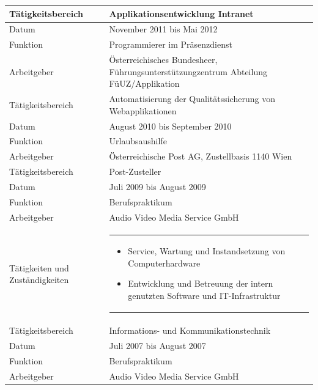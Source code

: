 \begin{longtable}{p{}|p{}}
	Tätigkeitsbereich & Applikationsentwicklung Intranet \\
	\bottomrule
	\newpage
	Datum & November 2011 bis Mai 2012 \\
	Funktion & Programmierer im Präsenzdienst \\
	Arbeitgeber & Österreichisches Bundesheer, Führungsunterstützungzentrum Abteilung FüUZ/Applikation \\
	Tätigkeitsbereich & Automatisierung der Qualitätssicherung von Webapplikationen \\ \bottomrule
	Datum & August 2010 bis September 2010 \\
	Funktion & Urlaubsaushilfe \\
	Arbeitgeber & Österreichische Post AG, Zustellbasis 1140 Wien \\
	Tätigkeitsbereich & Post-Zusteller \\ \bottomrule
	Datum & Juli 2009 bis August 2009 \\
	Funktion & Berufspraktikum \\
	Arbeitgeber & Audio Video Media Service GmbH \\
	Tätigkeiten und Zuständigkeiten &
	\begin{tabular} {m{} m{} }
	\begin{itemize}[nosep,leftmargin=1em] 
	\item Service, Wartung und Instandsetzung von Computerhardware
    \item Entwicklung und Betreuung der intern genutzten Software und IT-Infrastruktur
	\end{itemize}
	\end{tabular}
	\\
	Tätigkeitsbereich & Informations- und Kommunikationstechnik \\
	\bottomrule
	Datum & Juli 2007 bis August 2007 \\
	Funktion & Berufspraktikum \\
	Arbeitgeber & Audio Video Media Service GmbH \\

\end{longtable}
